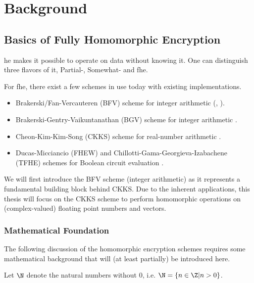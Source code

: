 \chapter{Background}
\label{chap:background}

\section{Basics of Fully Homomorphic Encryption}
\gls{he} makes it possible to operate on data without knowing it.
One can distinguish three flavors of it, Partial-, Somewhat- and \gls{fhe}.

For \Gls{fhe}, there exist a few schemes in use today with existing implementations.
\begin{itemize}
  \item Brakerski/Fan-Vercauteren (BFV) scheme for integer arithmetic
        (\cite{2012-fv-original}, \cite{2012-brakerski}).
  \item Brakerski-Gentry-Vaikuntanathan (BGV) scheme for integer arithmetic \parencite{2012-bgv-original}.
  \item Cheon-Kim-Kim-Song (CKKS) scheme for real-number arithmetic \parencite{2017-ckks-original}.
  \item Ducas-Micciancio (FHEW) and Chillotti-Gama-Georgieva-Izabachene (TFHE) schemes for Boolean circuit evaluation
        \parencite{2019-tfhe-original}.
\end{itemize}

We will first introduce the BFV scheme (integer arithmetic) as it represents a fundamental building block behind CKKS.
Due to the inherent applications, this thesis will focus on the CKKS scheme to perform homomorphic operations
on (complex-valued) floating point numbers and vectors.

\subsection{Mathematical Foundation}
The following discussion of the homomorphic encryption schemes requires some mathematical background that
will (at least partially) be introduced here.

Let $\N$ denote the natural numbers without $0$, i.e. $\N = \{n \in \Z | n > 0\}$.

